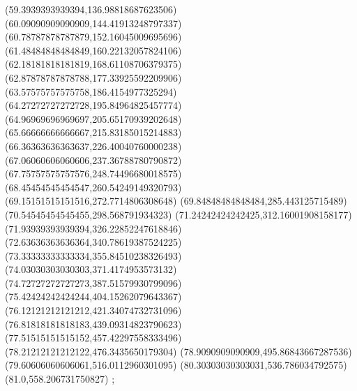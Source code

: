 {(59.3939393939394,136.98818687623506)
(60.09090909090909,144.41913248797337)
(60.78787878787879,152.16045009695696)
(61.48484848484849,160.22132057824106)
(62.18181818181819,168.61108706379375)
(62.87878787878788,177.33925592209906)
(63.57575757575758,186.4154977325294)
(64.27272727272728,195.84964825457774)
(64.96969696969697,205.65170939202648)
(65.66666666666667,215.83185015214883)
(66.36363636363637,226.40040760000238)
(67.06060606060606,237.36788780790872)
(67.75757575757576,248.74496680018575)
(68.45454545454547,260.54249149320793)
(69.15151515151516,272.7714806308648)
(69.84848484848484,285.443125715489)
(70.54545454545455,298.568791934323)
(71.24242424242425,312.16001908158177)
(71.93939393939394,326.22852247618846)
(72.63636363636364,340.78619387524225)
(73.33333333333334,355.84510238326493)
(74.03030303030303,371.4174953573132)
(74.72727272727273,387.51579930799096)
(75.42424242424244,404.15262079643367)
(76.12121212121212,421.34074732731096)
(76.81818181818183,439.09314823790623)
(77.51515151515152,457.42297558333496)
(78.21212121212122,476.3435650179304)
(78.9090909090909,495.86843667287536)
(79.60606060606061,516.0112960301095)
(80.30303030303031,536.786034792575)
(81.0,558.206731750827)
};

